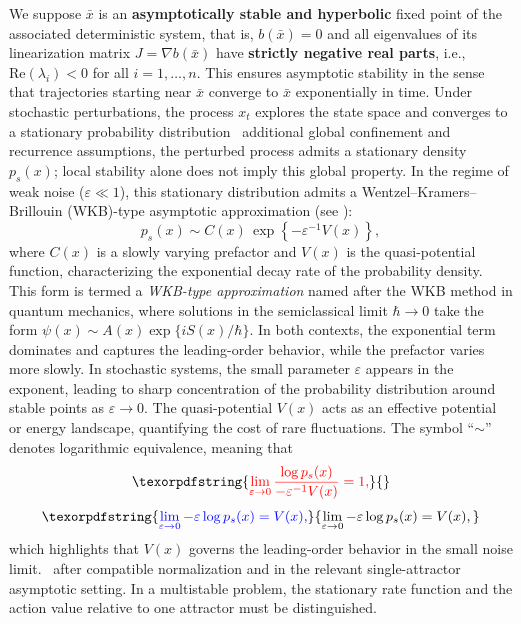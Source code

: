 \documentclass[11pt]{article}
\theoremstyle{plain}      %
\theoremstyle{definition} %
\providecommand{\DIFaddtex}[1]{{\protect\color{blue}#1}} %
\providecommand{\DIFdeltex}[1]{{\protect\color{red}#1}} %
\providecommand{\DIFaddbegin}{} %
\providecommand{\DIFaddend}{} %
\providecommand{\DIFdelbegin}{} %
\providecommand{\DIFdelend}{} %
\providecommand{\DIFadd}[1]{\texorpdfstring{\DIFaddtex{#1}}{#1}} %
\providecommand{\DIFdel}[1]{\texorpdfstring{\DIFdeltex{#1}}{}} %
\newcommand{\DIFscaledelfig}{1.0}
\newlength{\DIFdelgraphicswidth} %
\newlength{\DIFdelgraphicsheight} %
\newcommand{\DIFaddincludegraphics}[2][]{{\color{blue}\fbox{\DIFOincludegraphics[#1]{#2}}}} %
\newcommand{\DIFdelincludegraphics}[2][]{%
\sbox{\DIFdelgraphicsbox}{\DIFOincludegraphics[#1]{#2}}%
\settoboxwidth{\DIFdelgraphicswidth}{\DIFdelgraphicsbox} %
\settoboxtotalheight{\DIFdelgraphicsheight}{\DIFdelgraphicsbox} %
\scalebox{\DIFscaledelfig}{%
\parbox[b]{\DIFdelgraphicswidth}{\usebox{\DIFdelgraphicsbox}\\[-\baselineskip] \rule{\DIFdelgraphicswidth}{0em}}\llap{\resizebox{\DIFdelgraphicswidth}{\DIFdelgraphicsheight}{%
\setlength{\unitlength}{\DIFdelgraphicswidth}%
\begin{picture}(1,1)%
\thicklines\linethickness{2pt} %
{\color[rgb]{1,0,0}\put(0,0){\framebox(1,1){}}}%
{\color[rgb]{1,0,0}\put(0,0){\line( 1,1){1}}}%
{\color[rgb]{1,0,0}\put(0,1){\line(1,-1){1}}}%
\end{picture}%
}\hspace*{3pt}}} %
} %
\DeclareRobustCommand{\DIFaddbegin}{\DIFOaddbegin \let\includegraphics\DIFaddincludegraphics} %
\DeclareRobustCommand{\DIFaddend}{\DIFOaddend \let\includegraphics\DIFOincludegraphics} %
\DeclareRobustCommand{\DIFdelbegin}{\DIFOdelbegin \let\includegraphics\DIFdelincludegraphics} %
\DeclareRobustCommand{\DIFdelend}{\DIFOaddend \let\includegraphics\DIFOincludegraphics} %
\begin{document}
We suppose $\bar{x}$ is an \textbf{asymptotically stable and hyperbolic} fixed point of the associated deterministic system, that is, $b(\bar{x}) = 0$ and all eigenvalues of its linearization matrix $J = \nabla b(\bar{x})$ have \textbf{strictly negative real parts}, i.e., $\text{Re}(\lambda_i) < 0$ for all $i = 1,\ldots,n$. This ensures asymptotic stability in the sense that trajectories starting near $\bar{x}$ converge to $\bar{x}$ exponentially in time. Under \DIFdelbegin \DIFdel{stochastic perturbations, the process $x_t$ explores the state space and converges to a stationary probability distribution }\DIFdelend\ \DIFaddbegin \DIFadd{additional global confinement and recurrence assumptions, the perturbed process admits a stationary density }\DIFaddend $p_s(x)$\DIFaddbegin \DIFadd{; local stability alone does not imply this global property}\DIFaddend . In the regime of weak noise ($\varepsilon \ll 1$), this stationary distribution admits a Wentzel--Kramers--Brillouin (WKB)-type asymptotic approximation (see \cite{chen2017singularities,li2022machine,smelyanskiy1997topological}):
\begin{equation}
\label{WKB}
p_s(x) \sim C(x)\, \exp\left\{-\varepsilon^{-1} V(x)\right\},
\end{equation}
where \( C(x) \) is a slowly varying prefactor and \( V(x) \) is the quasi-potential function, characterizing the exponential decay rate of the probability density. This form is termed a \emph{WKB-type approximation} named after the WKB method in quantum mechanics, where solutions in the semiclassical limit \( \hbar \to 0 \) take the form \( \psi(x) \sim A(x)\exp\{i S(x)/\hbar\} \). In both contexts, the exponential term dominates and captures the leading-order behavior, while the prefactor varies more slowly. In stochastic systems, the small parameter \( \varepsilon \) appears in the exponent, leading to sharp concentration of the probability distribution around stable points as \( \varepsilon \to 0 \). The quasi-potential \( V(x) \) acts as an effective potential or energy landscape, quantifying the cost of rare fluctuations. The symbol ``\( \sim \)'' denotes logarithmic equivalence, meaning that
\DIFdelbegin \[
\DIFdel{\lim_{\varepsilon \to 0} \frac{\log p_s(x)}{-\varepsilon^{-1} V(x)} = 1,
}\]%
\DIFdelend \DIFaddbegin \[
\DIFadd{\lim_{\varepsilon \to 0}-\varepsilon\log p_s(x)=V(x),
}\]\DIFaddend 
\DIFdelbegin \DIFdel{which highlights that \( V(x) \) governs the leading-order behavior in the small noise limit. }\DIFdelend\ \DIFaddbegin \DIFadd{after compatible normalization and in the relevant single-attractor asymptotic setting. In a multistable problem, the stationary rate function and the action value relative to one attractor must be distinguished.
}\DIFaddend 
\end{document}
